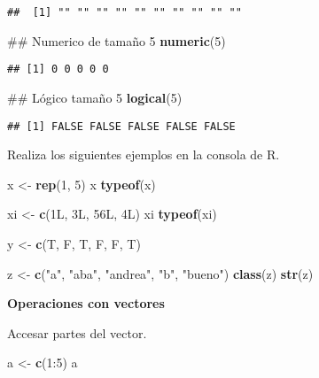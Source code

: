 \documentclass[]{article}
\newenvironment{Shaded}{\begin{snugshade}}{\end{snugshade}}
\newcommand{\KeywordTok}[1]{\textcolor[rgb]{0.13,0.29,0.53}{\textbf{{#1}}}}
\newcommand{\DecValTok}[1]{\textcolor[rgb]{0.00,0.00,0.81}{{#1}}}
\newcommand{\StringTok}[1]{\textcolor[rgb]{0.31,0.60,0.02}{{#1}}}
\newcommand{\NormalTok}[1]{{#1}}
\begin{document}
\begin{verbatim}
##  [1] "" "" "" "" "" "" "" "" "" ""
\end{verbatim}

\begin{Shaded}
\begin{Highlighting}[]
\NormalTok{## Numerico de tamaño 5}
\KeywordTok{numeric}\NormalTok{(}\DecValTok{5}\NormalTok{)}
\end{Highlighting}
\end{Shaded}

\begin{verbatim}
## [1] 0 0 0 0 0
\end{verbatim}

\begin{Shaded}
\begin{Highlighting}[]
\NormalTok{## Lógico tamaño 5}
\KeywordTok{logical}\NormalTok{(}\DecValTok{5}\NormalTok{)}
\end{Highlighting}
\end{Shaded}

\begin{verbatim}
## [1] FALSE FALSE FALSE FALSE FALSE
\end{verbatim}

Realiza los siguientes ejemplos en la consola de R.

\begin{Shaded}
\begin{Highlighting}[]
\NormalTok{x <-}\StringTok{ }\KeywordTok{rep}\NormalTok{(}\DecValTok{1}\NormalTok{, }\DecValTok{5}\NormalTok{)}
\NormalTok{x}
\KeywordTok{typeof}\NormalTok{(x)}

\NormalTok{xi <-}\StringTok{ }\KeywordTok{c}\NormalTok{(1L, 3L, 56L, 4L)}
\NormalTok{xi}
\KeywordTok{typeof}\NormalTok{(xi)}

\NormalTok{y <-}\StringTok{ }\KeywordTok{c}\NormalTok{(T, F, T, F, F, T)}

\NormalTok{z <-}\StringTok{ }\KeywordTok{c}\NormalTok{(}\StringTok{"a"}\NormalTok{, }\StringTok{"aba"}\NormalTok{, }\StringTok{"andrea"}\NormalTok{, }\StringTok{"b"}\NormalTok{, }\StringTok{"bueno"}\NormalTok{)}
\KeywordTok{class}\NormalTok{(z)}
\KeywordTok{str}\NormalTok{(z)}
\end{Highlighting}
\end{Shaded}

\textbf{Operaciones con vectores}

Accesar partes del vector.

\begin{Shaded}
\begin{Highlighting}[]
\NormalTok{a <-}\StringTok{ }\KeywordTok{c}\NormalTok{(}\DecValTok{1}\NormalTok{:}\DecValTok{5}\NormalTok{)}
\NormalTok{a}
\end{Highlighting}
\end{Shaded}
\end{document}
